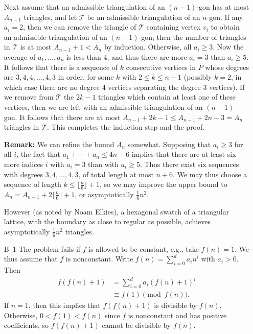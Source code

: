 \documentclass[amssymb,twocolumn,pra,10pt,aps]{revtex4-1}
\begin{document}
\begin{itemize}
Next assume that an admissible triangulation of an $(n-1)$-gon has at
most $A_{n-1}$ triangles, and let $\mathcal{T}$ be an admissible
triangulation of an $n$-gon. If any $a_i = 2$, then we can remove the
triangle of $\mathcal{T}$ containing vertex $v_i$ to obtain an
admissible triangulation of an $(n-1)$-gon; then the number of
triangles in $\mathcal{T}$ is at most $A_{n-1}+1 < A_n$ by induction.
Otherwise, all $a_i \geq 3$. Now the average of $a_1,\dots,a_n$ is
less than $4$, and thus there are more $a_i = 3$ than $a_i \geq 5$. It
follows that there is a sequence of $k$ consecutive vertices in $P$
whose degrees are $3,4,4,\ldots,4,3$ in order, for some $k$ with
$2\leq k\leq n-1$ (possibly $k=2$, in which case there are no degree
$4$ vertices separating the degree $3$ vertices). If we remove from
$\mathcal{T}$ the $2k-1$ triangles which contain at least one of these
vertices, then we are left with an admissible triangulation of an
$(n-1)$-gon. It follows that there are at most $A_{n-1}+2k-1 \leq
A_{n-1}+2n-3 = A_n$ triangles in $\mathcal{T}$. This completes the
induction step and the proof.

\textbf{Remark:}
We can refine the bound $A_n$ somewhat.
Supposing that $a_i \geq 3$ for all
$i$, the fact that $a_1 + \cdots + a_n \leq 4n-6$ implies that there are at least
six more indices $i$ with $a_i = 3$ than with $a_i \geq 5$. Thus there exist
six sequences with degrees $3,4,\dots,4,3$, of total length at most
$n+6$. We may thus choose a sequence of length $k \leq \lfloor \frac{n}{6}
\rfloor + 1$, so we may improve the upper bound to $A_n = A_{n-1} +
2 \lfloor \frac{n}{6} \rfloor + 1$, or asymptotically
$\frac{1}{6} n^2$.

However (as noted by Noam Elkies), a hexagonal swatch of a triangular
lattice, with the boundary as close to regular as possible,
achieves asymptotically $\frac{1}{6} n^2$ triangles.

\item[B--1]
The problem fails if $f$ is allowed to be constant, e.g., take $f(n) = 1$.
We thus assume that $f$ is nonconstant.
Write $f(n) = \sum_{i=0}^d a_i n^i$ with $a_i > 0$. Then
\begin{align*}
f(f(n)+1) &= \sum_{i=0}^d a_i (f(n) + 1)^i \\
&\equiv f(1) \pmod{f(n)}.
\end{align*}
If $n = 1$, then this implies that $f(f(n)+1)$ is divisible by $f(n)$.
Otherwise, $0 < f(1) < f(n)$ since $f$ is nonconstant and has positive
coefficients, so $f(f(n)+1)$ cannot be divisible by $f(n)$.


\end{itemize}
\end{document}
